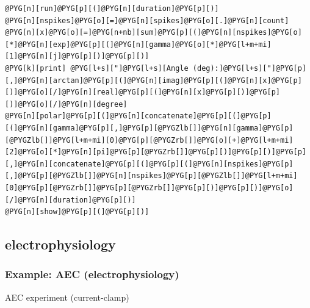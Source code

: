 \documentclass[letterpaper,10pt,english]{manual}
\begin{document}
\begin{Verbatim}[commandchars=@\[\]]
@PYG[n][run]@PYG[p][(]@PYG[n][duration]@PYG[p][)]
@PYG[n][nspikes]@PYG[o][=]@PYG[n][spikes]@PYG[o][.]@PYG[n][count]
@PYG[n][x]@PYG[o][=]@PYG[n+nb][sum]@PYG[p][(]@PYG[n][nspikes]@PYG[o][*]@PYG[n][exp]@PYG[p][(]@PYG[n][gamma]@PYG[o][*]@PYG[l+m+mi][1]@PYG[n][j]@PYG[p][)]@PYG[p][)]
@PYG[k][print] @PYG[l+s]["]@PYG[l+s][Angle (deg):]@PYG[l+s]["]@PYG[p][,]@PYG[n][arctan]@PYG[p][(]@PYG[n][imag]@PYG[p][(]@PYG[n][x]@PYG[p][)]@PYG[o][/]@PYG[n][real]@PYG[p][(]@PYG[n][x]@PYG[p][)]@PYG[p][)]@PYG[o][/]@PYG[n][degree]
@PYG[n][polar]@PYG[p][(]@PYG[n][concatenate]@PYG[p][(]@PYG[p][(]@PYG[n][gamma]@PYG[p][,]@PYG[p][@PYGZlb[]]@PYG[n][gamma]@PYG[p][@PYGZlb[]]@PYG[l+m+mi][0]@PYG[p][@PYGZrb[]]@PYG[o][+]@PYG[l+m+mi][2]@PYG[o][*]@PYG[n][pi]@PYG[p][@PYGZrb[]]@PYG[p][)]@PYG[p][)]@PYG[p][,]@PYG[n][concatenate]@PYG[p][(]@PYG[p][(]@PYG[n][nspikes]@PYG[p][,]@PYG[p][@PYGZlb[]]@PYG[n][nspikes]@PYG[p][@PYGZlb[]]@PYG[l+m+mi][0]@PYG[p][@PYGZrb[]]@PYG[p][@PYGZrb[]]@PYG[p][)]@PYG[p][)]@PYG[o][/]@PYG[n][duration]@PYG[p][)]
@PYG[n][show]@PYG[p][(]@PYG[p][)]
\end{Verbatim}


\subsection{electrophysiology}

\resetcurrentobjects
\hypertarget{--doc-examples-electrophysiology_AEC}{}

\hypertarget{index-22}{}\subsubsection{Example: AEC (electrophysiology)}

AEC experiment (current-clamp)
\end{document}
